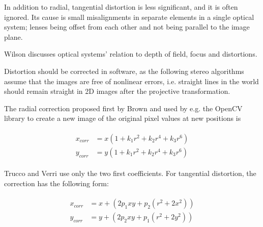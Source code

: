 In addition to radial, tangential distortion is less significant, and it is often ignored.
Its cause is small misalignments in separate elements in a single optical system; lenses being offset from each other and not being parallel to the image plane. \cite{kingslake1989history}

Wilson \cite{wilson2004anton} discusses optical systems' relation to depth of field, focus and distortions.


Distortion should be corrected in software, as the following stereo algorithms assume that the images are free of nonlinear errors, i.e. straight lines in the world should remain straight in 2D images after the projective transformation.

The radial correction proposed first by Brown \cite{brown1966decentering} and used by e.g. the OpenCV library \cite{opencv} to create a new image of the original pixel values at new positions is

\begin{align} \label{equ:radialdist} \begin{split}
	x_{corr} &= x(1 + k_1 r^2 + k_2 r^4 + k_3 r^6)\\
	y_{corr} &= y(1 + k_1 r^2 + k_2 r^4 + k_3 r^6)
\end{split} \end{align}


Trucco and Verri \cite{trucco1998introductory} use only the two first coefficients.
For tangential distortion, the correction has the following form:

\begin{align} \label{equ:tangdist} \begin{split}
x_{corr} &= x + (2 p_1 x y + p_2 (r^2 + 2 x^2))\\
y_{corr} &= y + (2 p_2 x y + p_1 (r^2 + 2 y^2))
\end{split} \end{align}

